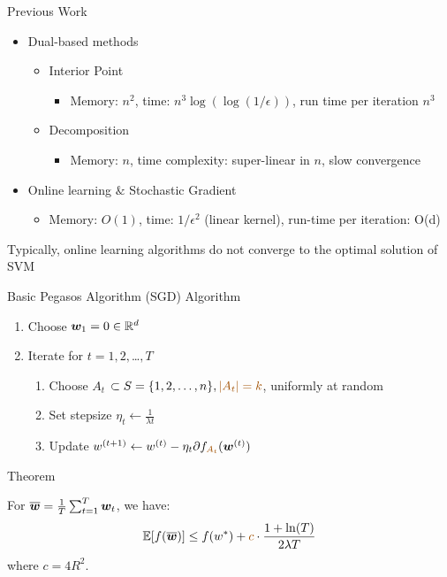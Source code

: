 \begin{frame}{Previous Work}
    \begin{itemize}
        \item Dual-based methods
            \begin{itemize}
                \item Interior Point
                    \begin{itemize}
                        \item Memory: $n^2$, time: $n^3 \log(\log(1/\epsilon))$, run time per iteration $n^3$
                    \end{itemize}
                \item Decomposition
                    \begin{itemize}
                        \item Memory: $n$, time complexity: super-linear in $n$, slow convergence
                    \end{itemize}
            \end{itemize}
        \item Online learning $\&$ Stochastic Gradient
            \begin{itemize}
                \item Memory: $O(1)$, time: $1/\epsilon^2$ (linear kernel), run-time per iteration: O(d)
            \end{itemize}
    \end{itemize}
    Typically, online learning algorithms do not converge to the optimal solution of SVM
\end{frame}

\begin{frame}{Basic Pegasos Algorithm (SGD)}
    {\color{blue} Algorithm}

    \begin{enumerate} 
        \item Choose $\bm{w}_1 = 0 \in \mathbb{R}^d$
        \item Iterate for $t = 1,2,$\ldots$,T$
        \begin{enumerate}
            \item Choose {\color{red} $A_t$} $\subset S = \{1,2,\ldots,n\},{\color{red}|A_t|=k}$, uniformly at random
            \item Set stepsize $\eta_t \leftarrow \frac{1}{\lambda t}$
            \item Update $w^{(t+1)} \leftarrow w^{(t)} - \eta_t \partial f_{{\color{red}A_t}}(\wv^{ (t)})$
        \end{enumerate}
    \end{enumerate}

    {\color{blue} Theorem}

    For $\overline{\bm{w}} = \frac1T \sum_{t=1}^T \bm{w}_t $, we have:
    \[
        \E[f(\overline{\wv})]\le f(w^*) + {\color{red} c} \cdot \frac{1+\ln(T)}{2\lambda T}
    \]
    where $c=4R^2$.
\end{frame}

